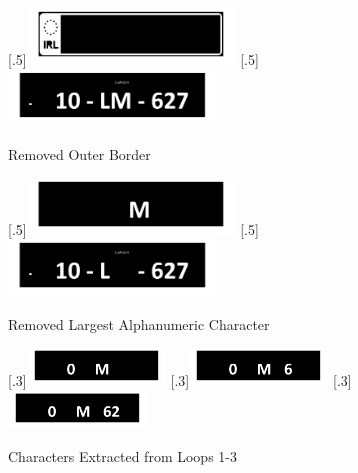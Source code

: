 \documentclass[a4paper]{article}
\begin{document}
	\begin{figure}[H]
		\centering
		[.5\linewidth]{\includegraphics[height=1.5cm]{Results/Q2/NumPlate6/qanumber_plate_6Border.jpg}}%
		[.5\linewidth]{\includegraphics[height=1.5cm]{Results/Q2/NumPlate6/qanumber_plate_6NoBorder.jpg}}%
		\caption{Removed Outer Border}
		\label{fig:}
	\end{figure}
	\begin{figure}[H]
		\centering
		[.5\linewidth]{\includegraphics[height=1.5cm]{Results/Q2/NumPlate6/qanumber_plate_6BigChar.jpg}}%
		[.5\linewidth]{\includegraphics[height=1.5cm]{Results/Q2/NumPlate6/qanumber_plate_6Remain.jpg}}%
		\caption{Removed Largest Alphanumeric Character}
		\label{fig:}
	\end{figure}
	\begin{figure}[H]
		\centering
		[.3\linewidth]{\includegraphics[height=1cm]{Results/Q2/NumPlate6/qanumber_plate_6Added1.jpg}}%
		[.3\linewidth]{\includegraphics[height=1cm]{Results/Q2/NumPlate6/qanumber_plate_6Added2.jpg}}%
		[.3\linewidth]{\includegraphics[height=1cm]{Results/Q2/NumPlate6/qanumber_plate_6Added3.jpg}}%
		\caption{Characters Extracted from Loops 1-3}
		\label{fig:}
	\end{figure}
\end{document}
